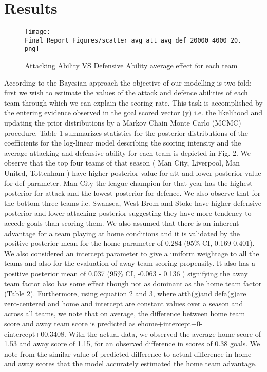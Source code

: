 \documentclass{article}
\begin{document}
\section{Results}

\begin{figure*}[!htb]
\centering
\texttt{[image: Final\_Report\_Figures/scatter\_avg\_att\_avg\_def\_20000\_4000\_20.png]}
\caption{Attacking Ability VS Defensive Ability average effect for each team}
\label{fig:att_def_scatterplot}
\end{figure*}

According to the Bayesian approach the objective of our modelling is two-fold: first we wish to estimate the values of the attack and defence abilities of each team through which we can explain the scoring rate. This task is accomplished by the entering evidence observed in the goal scored vector (y) i.e. the likelihood and updating the prior distributions by a Markov Chain Monte Carlo (MCMC) procedure.  Table 1 summarizes statistics for the posterior distributions of the coefficients for the log-linear model describing the scoring intensity and the average attacking and defensive ability for each team is depicted in Fig. 2. We observe that the top four teams of that season ( Man City, Liverpool, Man United, Tottenham ) have higher posterior value for att and lower posterior value for def parameter. Man City the league champion for that year has the highest posterior for attack and the lowest posterior for defence. We also observe that for the bottom three teams i.e. Swansea, West Brom and Stoke have higher defensive posterior and lower attacking posterior suggesting they have more tendency to accede goals than scoring them. We also assumed that there is an inherent advantage for a team playing at home conditions and it is validated by the positive posterior mean for the home parameter of 0.284 (95\% CI, 0.169-0.401). We also considered an intercept parameter to give a uniform weightage to all the teams and also for the evaluation of away team scoring propensity. It also has a positive posterior mean of 0.037 (95\% CI, -0.063 - 0.136 ) signifying the away team factor also has some effect though not as dominant as the home team factor (Table 2). Furthermore, using equation 2 and 3, where atth(g)and defa(g)are zero-centered and home and intercept are constant values over a season and across all teams, we note that on average, the difference between home team score and away team score is predicted as ehome+intercept+0-eintercept+00.3408. With the actual data, we observed the average home score of 1.53 and away score of 1.15, for an observed difference in scores of 0.38 goals. We note from the similar value of predicted difference to actual difference in home and away scores that the model accurately estimated the home team advantage.
\end{document}
